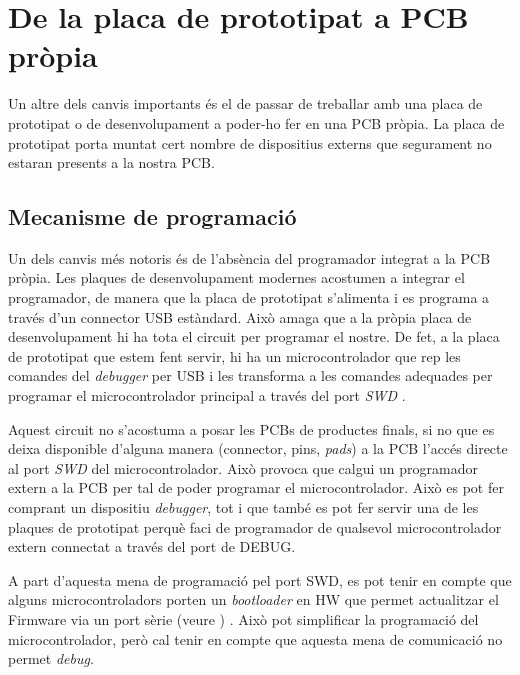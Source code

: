 \section{De la placa de prototipat a PCB pròpia}
Un altre dels canvis importants és el de passar de treballar amb una placa de prototipat o de desenvolupament a poder-ho fer en una PCB pròpia. La placa de prototipat porta muntat cert nombre de dispositius externs que segurament no estaran presents a la nostra PCB.

\subsection{Mecanisme de programació}
Un dels canvis més notoris és de l'absència del programador integrat a la PCB pròpia. Les plaques de desenvolupament modernes acostumen a integrar el programador, de manera que la placa de prototipat s'alimenta i es programa a través d'un connector USB estàndard. Això amaga que a la pròpia placa de desenvolupament hi ha tota el circuit per programar el nostre. De fet, a la placa de prototipat que estem fent servir, hi ha un microcontrolador que rep les comandes del {\em debugger} per USB i les transforma a les comandes adequades per programar el microcontrolador principal a través del port {\em SWD} \cite[30]{USERMANUALDEVKIT}.

Aquest circuit no s'acostuma a posar les PCBs de productes finals, si no que es deixa disponible d'alguna manera (connector, pins, {\em pads}) a la PCB l'accés directe al port {\em SWD} del microcontrolador. Això provoca que calgui un programador extern a la PCB per tal de poder programar el microcontrolador. Això es pot fer comprant un dispositiu {\em debugger}, tot i que també es pot fer servir una de les plaques de prototipat perquè faci de programador de qualsevol microcontrolador extern connectat a través del port de DEBUG.

A part d'aquesta mena de programació pel port SWD, es pot tenir en compte que alguns microcontroladors porten un {\em bootloader} en HW que permet actualitzar el Firmware via un port sèrie (veure ) \cite{AN0003}. Això pot simplificar la programació del microcontrolador, però cal tenir en compte que aquesta mena de comunicació no permet {\em debug}. 


